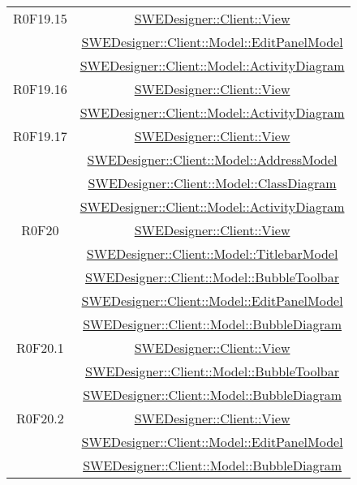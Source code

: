 \documentclass[../SpecificaTecnica.tex]{subfiles}
\begin{document}
\begin{longtable}{|c|c|}
		R0F19.15 & \hyperlink{SWEDesigner::Client::View}{SWEDesigner::Client::View} \\& \hyperlink{SWEDesigner::Client::Model::EditPanelModel}{SWEDesigner::Client::Model::EditPanelModel} \\& \hyperlink{SWEDesigner::Client::Model::ActivityDiagram}{SWEDesigner::Client::Model::ActivityDiagram} \\\hline
		R0F19.16 & \hyperlink{SWEDesigner::Client::View}{SWEDesigner::Client::View} \\& \hyperlink{SWEDesigner::Client::Model::ActivityDiagram}{SWEDesigner::Client::Model::ActivityDiagram}\\\hline
		R0F19.17 & \hyperlink{SWEDesigner::Client::View}{SWEDesigner::Client::View} \\& \hyperlink{SWEDesigner::Client::Model::AddressModel}{SWEDesigner::Client::Model::AddressModel} \\& \hyperlink{SWEDesigner::Client::Model::ClassDiagram}{SWEDesigner::Client::Model::ClassDiagram} \\& \hyperlink{SWEDesigner::Client::Model::ActivityDiagram}{SWEDesigner::Client::Model::ActivityDiagram} \\\hline
		R0F20 & \hyperlink{SWEDesigner::Client::View}{SWEDesigner::Client::View} \\& \hyperlink{SWEDesigner::Client::Model::TitlebarModel}{SWEDesigner::Client::Model::TitlebarModel} \\& \hyperlink{SWEDesigner::Client::Model::BubbleToolbar}{SWEDesigner::Client::Model::BubbleToolbar} \\& \hyperlink{SWEDesigner::Client::Model::EditPanelModel}{SWEDesigner::Client::Model::EditPanelModel} \\& \hyperlink{SWEDesigner::Client::Model::BubbleDiagram}{SWEDesigner::Client::Model::BubbleDiagram}\\\hline
		R0F20.1 & \hyperlink{SWEDesigner::Client::View}{SWEDesigner::Client::View} \\& \hyperlink{SWEDesigner::Client::Model::BubbleToolbar}{SWEDesigner::Client::Model::BubbleToolbar} \\& \hyperlink{SWEDesigner::Client::Model::BubbleDiagram}{SWEDesigner::Client::Model::BubbleDiagram}\\\hline
		R0F20.2 & \hyperlink{SWEDesigner::Client::View}{SWEDesigner::Client::View} \\& \hyperlink{SWEDesigner::Client::Model::EditPanelModel}{SWEDesigner::Client::Model::EditPanelModel} \\& \hyperlink{SWEDesigner::Client::Model::BubbleDiagram}{SWEDesigner::Client::Model::BubbleDiagram}\\\hline

\end{longtable}
\end{document}
